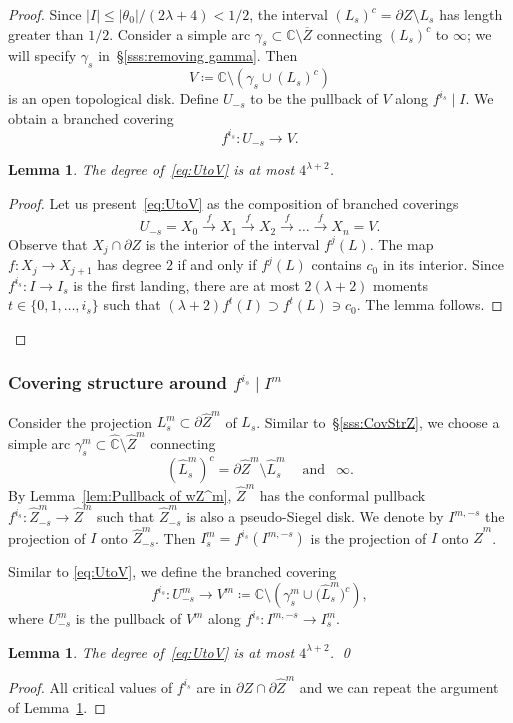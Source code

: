 \documentclass{amsart}
\renewcommand{\sp}{{\ \ }}
\newcommand{\1}{{\mathbb 1 }}
\newcommand{\wL}{{\widehat L}}
\newcommand{\wZ}{{\widehat Z}}
\newcommand{\wC}{\widehat{\mathbb{C}}}
\newcommand{\C}{\mathbb{C}}
\newtheorem{lem}[thm]{Lemma}
\theoremstyle{remark}
\numberwithin{equation}{section}
\theoremstyle{definition}
\begin{document}
\begin{proof}
 Since $ |I|\le |\theta_0|/(2\lambda+4)<1/2$, the interval $(L_s)^c =\partial Z\setminus L_s$ has length greater than $1/2$. Consider a simple arc $\gamma_s\subset \C\setminus \overline Z$ connecting $(L_s)^c$ to $\infty$; we will specify $\gamma_s$ in~\S\ref{sss:removing gamma}. Then 
\begin{equation}
\label{eq:BrStr:V}
V\coloneqq \C\setminus (\gamma_s\cup (L_s)^c)
\end{equation}
is an open topological disk. Define $U_{-s}$ to be the pullback of $V$ along $f^{i_s}\mid I$. We obtain a branched covering 
\begin{equation}
\label{eq:UtoV}
f^{i_s}\colon U_{-s} \to V.
\end{equation}
\begin{lem}
\label{lem:f:UtoV}
The degree of~\eqref{eq:UtoV} is at most $4^{\lambda+2}$. 
\end{lem}
\begin{proof}
Let us present~\eqref{eq:UtoV} as the composition of branched coverings 
\[U_{-s}=X_0\overset{f}{\longrightarrow} X_1\overset{f}{\longrightarrow} X_2 \overset{f}{\longrightarrow} \dots \overset{f}{\longrightarrow} X_n=V.\] 
Observe that $X_j \cap \partial Z$ is the interior of the interval $f^{j}(L)$. The map $f\colon X_j\to X_{j+1}$ has degree $2$ if and only if $f^{j}(L)$ contains $c_0$ in its interior. Since $f^{i_s}\colon I\to I_s$ is the first landing, there are at most $2(\lambda+2)$ moments $t\in \{0,1,\dots, i_s\}$ such that $(\lambda+2)f^t(I)\supset  f^t(L)\ni c_0$. The lemma follows.
\end{proof}
\end{proof}


\subsubsection{Covering structure around $f^{i_s}\mid I^m$} Consider the projection $L^m_s\subset \partial \wZ^m$ of $L_s$. Similar to~\S\ref{sss:CovStrZ}, we choose a simple arc $\gamma^m_s\subset \wC\setminus \wZ^m$ connecting
 \[(\wL^m_s)^c =\partial \wZ^m\setminus \wL^m_s\sp\sp\text{ and }\sp \infty.\]  
By Lemma~\ref{lem:Pullback of wZ^m}, $\wZ^m$ has the conformal pullback  $f^{i_s}\colon  \wZ^m_{-s} \to \wZ^m$ such that $\wZ^m_{-s}$ is also a pseudo-Siegel disk. We denote by $I^{m,-s}$ the projection of $I$ onto $\wZ^m_{-s}$. Then $ I^m_s=f^{i_s}(I^{m,-s})$ is the projection of $I$ onto $\wZ^m$.

 Similar to \eqref{eq:UtoV}, we define the branched covering
\begin{equation}
\label{eq:UtoV:m}
f^{i_s}\colon U^m_{-s} \to V^m\coloneqq  \C\setminus \left(\gamma^m_s\cup \big(\wL^m_s\big)^c\right),
\end{equation}
where $U^m_{-s}$ is the pullback of $V^m$ along $f^{i_s}\colon I^{m,-s}\to I^m_s$.
\begin{lem}
\label{lem:f:UtoV:m}
The degree of~\eqref{eq:UtoV} is at most $4^{\lambda+2}$. \qed
\end{lem}
\begin{proof}
All critical values of $f^{i_s}$ are in $\partial Z\cap \partial \wZ^m$ and we can repeat the argument of Lemma~\ref{lem:f:UtoV}.
\end{proof}
\end{document}
